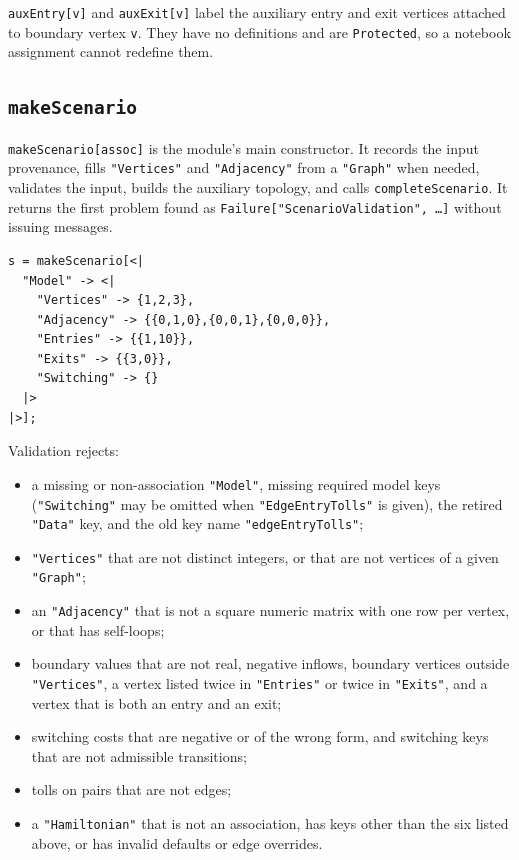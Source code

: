 \documentclass[11pt]{article}
\begin{document}
\texttt{auxEntry[v]} and \texttt{auxExit[v]} label the auxiliary entry and exit vertices attached to boundary vertex \texttt{v}. They have no definitions and are \texttt{Protected}, so a notebook assignment cannot redefine them.

\subsection*{\texttt{makeScenario}}

\texttt{makeScenario[assoc]} is the module's main constructor. It records the input provenance, fills \texttt{"Vertices"} and \texttt{"Adjacency"} from a \texttt{"Graph"} when needed, validates the input, builds the auxiliary topology, and calls \texttt{completeScenario}. It returns the first problem found as \texttt{Failure["ScenarioValidation", \ldots]} without issuing messages.

\begin{verbatim}
s = makeScenario[<|
  "Model" -> <|
    "Vertices" -> {1,2,3},
    "Adjacency" -> {{0,1,0},{0,0,1},{0,0,0}},
    "Entries" -> {{1,10}},
    "Exits" -> {{3,0}},
    "Switching" -> {}
  |>
|>];
\end{verbatim}

Validation rejects:
\begin{itemize}
\item a missing or non-association \texttt{"Model"}, missing required model keys (\texttt{"Switching"} may be omitted when \texttt{"EdgeEntryTolls"} is given), the retired \texttt{"Data"} key, and the old key name \texttt{"edgeEntryTolls"};
\item \texttt{"Vertices"} that are not distinct integers, or that are not vertices of a given \texttt{"Graph"};
\item an \texttt{"Adjacency"} that is not a square numeric matrix with one row per vertex, or that has self-loops;
\item boundary values that are not real, negative inflows, boundary vertices outside \texttt{"Vertices"}, a vertex listed twice in \texttt{"Entries"} or twice in \texttt{"Exits"}, and a vertex that is both an entry and an exit;
\item switching costs that are negative or of the wrong form, and switching keys that are not admissible transitions;
\item tolls on pairs that are not edges;
\item a \texttt{"Hamiltonian"} that is not an association, has keys other than the six listed above, or has invalid defaults or edge overrides.
\end{itemize}
\end{document}
